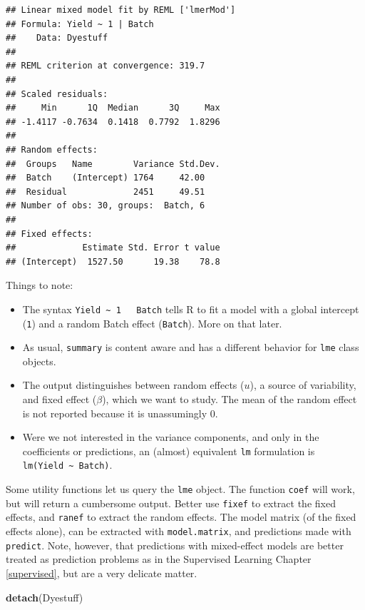 \documentclass[]{book}
\newenvironment{Shaded}{\begin{snugshade}}{\end{snugshade}}
\newcommand{\KeywordTok}[1]{\textcolor[rgb]{0.13,0.29,0.53}{\textbf{#1}}}
\newcommand{\NormalTok}[1]{#1}
\providecommand{\tightlist}{%
  \setlength{\itemsep}{0pt}\setlength{\parskip}{0pt}}
\theoremstyle{definition}
\theoremstyle{definition}
\theoremstyle{definition}
\theoremstyle{remark}
\begin{document}
\begin{verbatim}
## Linear mixed model fit by REML ['lmerMod']
## Formula: Yield ~ 1 | Batch
##    Data: Dyestuff
## 
## REML criterion at convergence: 319.7
## 
## Scaled residuals: 
##     Min      1Q  Median      3Q     Max 
## -1.4117 -0.7634  0.1418  0.7792  1.8296 
## 
## Random effects:
##  Groups   Name        Variance Std.Dev.
##  Batch    (Intercept) 1764     42.00   
##  Residual             2451     49.51   
## Number of obs: 30, groups:  Batch, 6
## 
## Fixed effects:
##             Estimate Std. Error t value
## (Intercept)  1527.50      19.38    78.8
\end{verbatim}

Things to note:

\begin{itemize}
\tightlist
\item
  The syntax \texttt{Yield\ \textasciitilde{}\ 1\ \ \textbar{}\ Batch} tells R to fit a model with a global intercept (\texttt{1}) and a random Batch effect (\texttt{\textbar{}Batch}). More on that later.
\item
  As usual, \texttt{summary} is content aware and has a different behavior for \texttt{lme} class objects.
\item
  The output distinguishes between random effects (\(u\)), a source of variability, and fixed effect (\(\beta\)), which we want to study. The mean of the random effect is not reported because it is unassumingly 0.
\item
  Were we not interested in the variance components, and only in the coefficients or predictions, an (almost) equivalent \texttt{lm} formulation is \texttt{lm(Yield\ \textasciitilde{}\ Batch)}.
\end{itemize}

Some utility functions let us query the \texttt{lme} object.
The function \texttt{coef} will work, but will return a cumbersome output. Better use \texttt{fixef} to extract the fixed effects, and \texttt{ranef} to extract the random effects.
The model matrix (of the fixed effects alone), can be extracted with \texttt{model.matrix}, and predictions made with \texttt{predict}.
Note, however, that predictions with mixed-effect models are better treated as prediction problems as in the Supervised Learning Chapter \ref{supervised}, but are a very delicate matter.

\begin{Shaded}
\begin{Highlighting}[]
\KeywordTok{detach}\NormalTok{(Dyestuff)}
\end{Highlighting}
\end{Shaded}
\end{document}
